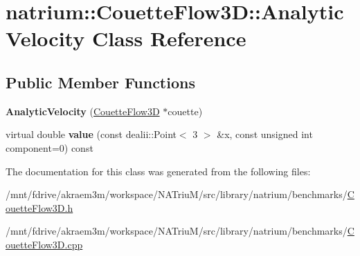 \hypertarget{classnatrium_1_1CouetteFlow3D_1_1AnalyticVelocity}{
\section{natrium::CouetteFlow3D::AnalyticVelocity Class Reference}
\label{classnatrium_1_1CouetteFlow3D_1_1AnalyticVelocity}
}
\subsection*{Public Member Functions}
\begin{DoxyCompactItemize}
\item 
\hypertarget{classnatrium_1_1CouetteFlow3D_1_1AnalyticVelocity_a52437301be614bb9129fabe6ad91dc12}{
{\bfseries AnalyticVelocity} (\hyperlink{classnatrium_1_1CouetteFlow3D}{CouetteFlow3D} $\ast$couette)}
\label{classnatrium_1_1CouetteFlow3D_1_1AnalyticVelocity_a52437301be614bb9129fabe6ad91dc12}

\item 
\hypertarget{classnatrium_1_1CouetteFlow3D_1_1AnalyticVelocity_a3089b09f900ac2faa7315e85d5b7a809}{
virtual double {\bfseries value} (const dealii::Point$<$ 3 $>$ \&x, const unsigned int component=0) const }
\label{classnatrium_1_1CouetteFlow3D_1_1AnalyticVelocity_a3089b09f900ac2faa7315e85d5b7a809}

\end{DoxyCompactItemize}


The documentation for this class was generated from the following files:\begin{DoxyCompactItemize}
\item 
/mnt/fdrive/akraem3m/workspace/NATriuM/src/library/natrium/benchmarks/\hyperlink{CouetteFlow3D_8h}{CouetteFlow3D.h}\item 
/mnt/fdrive/akraem3m/workspace/NATriuM/src/library/natrium/benchmarks/\hyperlink{CouetteFlow3D_8cpp}{CouetteFlow3D.cpp}\end{DoxyCompactItemize}
